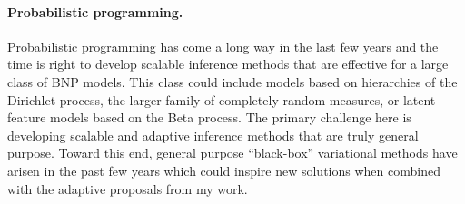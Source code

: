\documentclass[11pt,letterpaper,sans]{article}
\begin{document}
\paragraph{Probabilistic programming.}
Probabilistic programming has come a long way in the last few years and the time is right to develop scalable inference methods that are effective for a large class of BNP models. This class could include models based on hierarchies of the Dirichlet process, the larger family of completely random measures, or latent feature models based on the Beta process. The primary challenge here is developing scalable and adaptive inference methods that are truly general purpose. Toward this end, general purpose ``black-box'' variational methods \cite{kucukelbir:Stan, ranganath:blackbox} have arisen in the past few years which could inspire new solutions when combined with the adaptive proposals from my work.


\newpage


\end{document}
